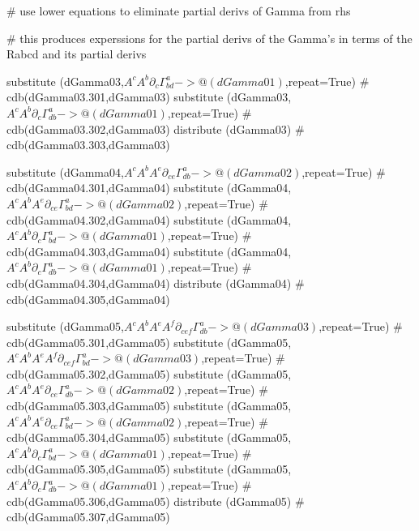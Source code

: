 \documentclass[12pt]{cdblatex}
\begin{document}
\begin{cadabra}
   # use lower equations to eliminate partial derivs of Gamma from rhs

   # this produces experssions for the partial derivs of the Gamma's in terms of the Rabcd and its partial derivs

   substitute (dGamma03,$A^{c}A^{b}\partial_{c}{\Gamma^{a}_{b d}} -> @(dGamma01)$,repeat=True)                 # cdb(dGamma03.301,dGamma03)
   substitute (dGamma03,$A^{c}A^{b}\partial_{c}{\Gamma^{a}_{d b}} -> @(dGamma01)$,repeat=True)                 # cdb(dGamma03.302,dGamma03)
   distribute (dGamma03)                                                                                       # cdb(dGamma03.303,dGamma03)

   substitute (dGamma04,$A^{c}A^{b}A^{e}\partial_{c e}{\Gamma^{a}_{d b}} -> @(dGamma02)$,repeat=True)          # cdb(dGamma04.301,dGamma04)
   substitute (dGamma04,$A^{c}A^{b}A^{e}\partial_{c e}{\Gamma^{a}_{b d}} -> @(dGamma02)$,repeat=True)          # cdb(dGamma04.302,dGamma04)
   substitute (dGamma04,$A^{c}A^{b}\partial_{c}{\Gamma^{a}_{b d}} -> @(dGamma01)$,repeat=True)                 # cdb(dGamma04.303,dGamma04)
   substitute (dGamma04,$A^{c}A^{b}\partial_{c}{\Gamma^{a}_{d b}} -> @(dGamma01)$,repeat=True)                 # cdb(dGamma04.304,dGamma04)
   distribute (dGamma04)                                                                                       # cdb(dGamma04.305,dGamma04)

   substitute (dGamma05,$A^{c}A^{b}A^{e}A^{f}\partial_{c e f}{\Gamma^{a}_{d b}} -> @(dGamma03)$,repeat=True)   # cdb(dGamma05.301,dGamma05)
   substitute (dGamma05,$A^{c}A^{b}A^{e}A^{f}\partial_{c e f}{\Gamma^{a}_{b d}} -> @(dGamma03)$,repeat=True)   # cdb(dGamma05.302,dGamma05)
   substitute (dGamma05,$A^{c}A^{b}A^{e}\partial_{c e}{\Gamma^{a}_{d b}} -> @(dGamma02)$,repeat=True)          # cdb(dGamma05.303,dGamma05)
   substitute (dGamma05,$A^{c}A^{b}A^{e}\partial_{c e}{\Gamma^{a}_{b d}} -> @(dGamma02)$,repeat=True)          # cdb(dGamma05.304,dGamma05)
   substitute (dGamma05,$A^{c}A^{b}\partial_{c}{\Gamma^{a}_{b d}} -> @(dGamma01)$,repeat=True)                 # cdb(dGamma05.305,dGamma05)
   substitute (dGamma05,$A^{c}A^{b}\partial_{c}{\Gamma^{a}_{d b}} -> @(dGamma01)$,repeat=True)                 # cdb(dGamma05.306,dGamma05)
   distribute (dGamma05)                                                                                       # cdb(dGamma05.307,dGamma05)

\end{cadabra}
\end{document}
